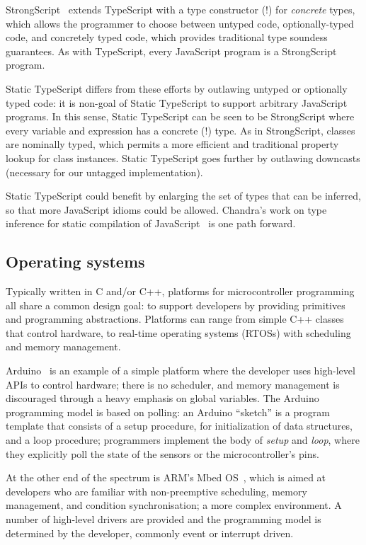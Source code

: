 StrongScript~\cite{StrongScriptECOOP15} extends TypeScript with a type constructor (!)
for \emph{concrete} types, which allows the programmer to choose between untyped
code, optionally-typed code, and concretely typed code, which provides traditional
type soundess guarantees. As with TypeScript, every JavaScript program is a StrongScript program. 

Static TypeScript differs from these efforts by outlawing untyped or optionally typed
code: it is non-goal of Static TypeScript to support arbitrary JavaScript programs.
In this sense, Static TypeScript can be seen to be StrongScript where every variable and 
expression has a concrete (!) type. As in StrongScript, classes are nominally typed,
which permits a more efficient and traditional property lookup for class instances. 
Static TypeScript goes further by outlawing downcasts (necessary for our untagged 
implementation).

Static TypeScript could benefit by enlarging the set of types
that can be inferred, so that more JavaScript idioms could be allowed. 
Chandra's work on type inference for static compilation of 
JavaScript~\cite{ChandraOOPSLA2016} is one path forward. 

\subsection{Operating systems}

Typically written in C and/or C++, platforms for microcontroller programming all share 
a common design goal: to support developers by providing primitives and programming 
abstractions. Platforms can range from simple C++ classes that control hardware, 
to real-time operating systems (RTOSs) with scheduling and memory management.

Arduino~\cite{buildingArduino2014} is an example of a simple platform where the developer uses 
high-level APIs to control hardware; there is no scheduler, and memory management 
is discouraged through a heavy emphasis on global variables.  The Arduino programming 
model is based on polling: an Arduino ``sketch'' is a program template that consists 
of a setup procedure, for initialization of data structures, and a loop procedure; 
programmers implement the body of \textit{setup} and \textit{loop}, where they explicitly 
poll the state of the sensors or the microcontroller's pins.

At the other end of the spectrum is ARM's Mbed OS~\cite{ARMmbed}, which is aimed at developers who are familiar 
with non-preemptive scheduling, memory management, and condition synchronisation; a more 
complex environment. A number of high-level drivers are provided and the programming model 
is determined by the developer, commonly event or interrupt driven.

